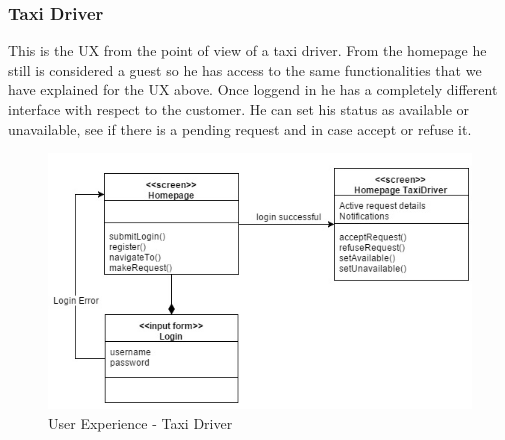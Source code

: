 \subsubsection{Taxi Driver}
This is the UX from the point of view of a taxi driver. From the homepage he still is considered a guest so he has access to the same functionalities that we have explained for the UX above. Once loggend in he has a completely different interface with respect to the customer. He can set his status as available or unavailable, see if there is a pending request and in case accept or refuse it.
\begin{figure}[h!]
	\begin{center}
		\includegraphics[width=1\linewidth]{../SE2_IMAGES/TaxiUX}
		\caption{User Experience - Taxi Driver}
	\end{center}
\end{figure}